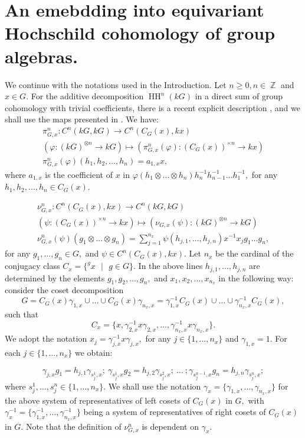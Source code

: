 \documentclass[pdflatex,sn-mathphys-num]{sn-jnl}
\numberwithin{equation}{section}
\theoremstyle{thmstyleone}
\theoremstyle{thmstyletwo}
\theoremstyle{thmstylethree}
\newcommand{\HH}{\operatorname{HH}}
\newcommand{\Z}{\operatorname{\mathbb{Z}}}
\begin{document}
\section{An emebdding into equivariant Hochschild cohomology of group algebras.}\label{sec3}
We continue with the notations used in the Introduction. Let $n\geq 0, n\in \Z$ and $x\in G.$ For the additive decomposition $\HH^n(kG)$ in a direct sum of group cohomology with trivial coefficients, there is a recent explicit description \citep{LiZh}, and we shall use the maps presented in \cite[Section 5]{CoTo}.
 We have:
\begin{align}\label{eq31}
    \pi_{G,x}^n: C^n(kG,kG)\rightarrow C^n(C_G(x),kx) \nonumber \\ (\varphi:(kG)^{\otimes n}\rightarrow kG)\mapsto (\pi_{G,x}^n(\varphi):(C_G(x))^{\times n}\rightarrow kx) \nonumber \\  \pi_{G,x}^n(\varphi)(h_1,h_2,\dots,h_n)=a_{1,x}x,
    \end{align}
where $a_{1,x}$ is the coefficient of $x$ in $\varphi(h_1\otimes \dots \otimes h_n)h_n^{-1}h_{n-1}^{-1} \dots  h_1^{-1},$
for any $h_1,h_2,\dots,h_n\in C_G(x).$

  \begin{align}\label{eq32}\nu_{G,x}^n:C^n(C_G(x),kx)\rightarrow C^n(kG,kG) \nonumber \\
  (\psi:(C_G(x))^{\times n}\rightarrow kx)\mapsto (\nu_{G,x}(\psi):(kG)^{\otimes n}\rightarrow kG) \nonumber \\
   \nu_{G,x}^n(\psi)(g_1\otimes \dots \otimes g_n)=\sum_{j=1}^{n_x}\psi(h_{j,1},\dots,h_{j,n})x^{-1}x_j g_1 \dots g_n,
   \end{align}
for any $g_1,\ldots,g_n\in G,$ and $\psi\in C^n(C_G(x),kx).$ Let $n_x$ be the cardinal of the conjugacy class $C_x=\{^gx\mbox{ }|\mbox{ }g\in G\}.$ In the above lines $h_{j,1},\ldots,h_{j,n}$ are determined by the elements $g_1,g_2,\ldots,g_n,$ and $x_1,x_2,\ldots, x_{n_x}$ in the following way: consider   the coset decomposition
   $$G=C_G(x)\gamma_{1,x}\cup \dots \cup C_G(x)\gamma_{n_x,x}=\gamma_{1,x}^{-1} C_G(x)\cup \dots \cup \gamma_{n_x,x}^{-1} C_G(x),$$
such that $$C_x=\{x, \gamma_{2,x}^{-1}x\gamma_{2,x},\ldots,\gamma_{n_x,x}^{-1}x\gamma_{n_x,x}\}.$$
We adopt the notation $x_j=\gamma_{j,x}^{-1}x\gamma_{j,x},$ for any $j\in \{1,\ldots,n_x\}$ and $\gamma_{1,x}=1.$ For each $j\in \{1,\ldots,n_x\}$ we obtain:

  \begin{equation}\label{eq33}
  \gamma_{j,x}g_1=h_{j,1}\gamma_{s_j^1,x};\  \gamma_{s_j^1,x}g_2=h_{j,2}\gamma_{s_j^2,x};\ \dots\ ;\gamma_{s_j^{n-1},x}g_n=h_{j,n}\gamma_{s_j^n,x};
  \end{equation}
where $s_j^1,\ldots,s_j^n\in\{1,\ldots,n_x\}.$
 We shall use the notation $\gamma_x=\{\gamma_{1,x},\ldots,\gamma_{n_x,x}\}$ for the above system of representatives of left cosets of $C_G(x)$ in $G,$ with  $\gamma_x^{-1}=\{\gamma_{1,x}^{-1},\ldots,\gamma_{n_x,x}^{-1}\}$ being  a system of representatives of right cosets of $C_G(x)$ in $G.$ Note that the definition of $\nu_{G,x}^n$ is dependent on $\gamma_x.$
\end{document}
